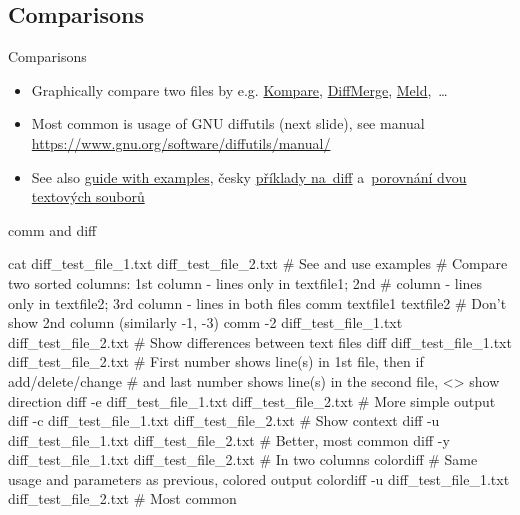 \documentclass[compress, xelatex, 11pt, xcolor=svgnames, aspectratio=169,
	hyperref={
		bookmarks=true,
		unicode=true,
		colorlinks=true,
		pdftitle={Linux, command line and MetaCentrum},
		plainpages=false,
		pdfauthor={Vojtech Zeisek},
		pdfsubject={Course about use of Linux command line, writing shell scripts and using MetaCentrum of CESNET},
		pdfcreator={XeLaTeX},
		pdfkeywords={Linux, GNU, BASH, shell, command line, MetaCentrum},
		linkcolor=DarkRed, %
		anchorcolor=DarkBlue, %
		citecolor=Indigo, %
		filecolor=NavyBlue, %
		menucolor=DarkMagenta, %
		urlcolor=DarkBlue, %
		},
	url={hyphens, lowtilde} %
	]{beamer}
\renewcommand{\texttt}[1]{\colorbox{Beige}{{\ttfamily #1}}}
\begin{document}
\subsection{Comparisons}

\begin{frame}{Comparisons}
	\begin{itemize}
		\item Graphically compare two files by e.g. \href{https://apps.kde.org/kompare}{Kompare}, \href{https://sourcegear.com/diffmerge/}{DiffMerge}, \href{https://meldmerge.org/}{Meld},~\ldots
		\item Most common is usage of GNU diffutils (next slide), see manual \url{https://www.gnu.org/software/diffutils/manual/}
		\item See also \href{https://www.computerhope.com/unix/udiff.htm}{guide with examples}, česky \href{https://blog.root.cz/petrkrcmar/diff-jak-cist-vystup-z-porovnani-souboru/}{příklady na~diff} a~\href{https://www.root.cz/clanky/nastroje-pro-porovnani-obsahu-dvou-textovych-souboru/}{porovnání dvou textových souborů}
	\end{itemize}
	\begin{center}
		\texttt{[image: kompare.png]}
	\end{center}
\end{frame}

\begin{frame}[fragile]{comm and diff}
	\begin{bashcode}
    cat diff_test_file_1.txt diff_test_file_2.txt # See and use examples
    # Compare two sorted columns: 1st column - lines only in textfile1; 2nd
    # column - lines only in textfile2; 3rd column - lines in both files
    comm textfile1 textfile2
    # Don't show 2nd column (similarly -1, -3)
    comm -2 diff_test_file_1.txt diff_test_file_2.txt
    # Show differences between text files
    diff diff_test_file_1.txt diff_test_file_2.txt
      # First number shows line(s) in 1st file, then if add/delete/change
      # and last number shows line(s) in the second file, <> show direction
    diff -e diff_test_file_1.txt diff_test_file_2.txt # More simple output
    diff -c diff_test_file_1.txt diff_test_file_2.txt # Show context
    diff -u diff_test_file_1.txt diff_test_file_2.txt # Better, most common
    diff -y diff_test_file_1.txt diff_test_file_2.txt # In two columns
    colordiff # Same usage and parameters as previous, colored output
    colordiff -u diff_test_file_1.txt diff_test_file_2.txt # Most common
	\end{bashcode}
\end{frame}
\end{document}
